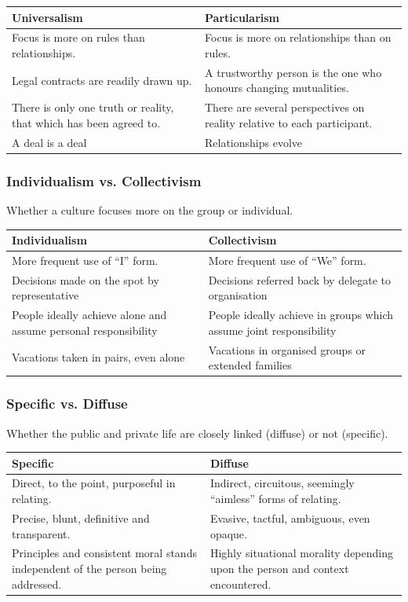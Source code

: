 \begin{tabularx}{\textwidth}{X|X}
	Universalism & Particularism \\ 
	\hline 
	Focus is more on rules than relationships. & Focus is more on relationships than on rules. \\ 
	Legal contracts are readily drawn up. & A trustworthy person is the one who honours changing mutualities. \\ 
	There is only one truth or reality, that which has been agreed to. & There are several perspectives on reality relative to each participant. \\ 
	A deal is a deal & Relationships evolve \\ 
\end{tabularx}

\subsubsection{Individualism vs. Collectivism}
Whether a culture focuses more on the group or individual.

\begin{tabularx}{\textwidth}{X|X}
	Individualism & Collectivism \\ 
	\hline 
	More frequent use of “I” form. & More frequent use of “We” form. \\ 
	Decisions made on the spot by representative & Decisions referred back by delegate to organisation \\ 
	People ideally achieve alone and assume personal responsibility & People ideally achieve in groups which assume joint responsibility \\ 
	Vacations taken in pairs, even alone & Vacations in organised groups or extended families \\ 
\end{tabularx}

\subsubsection{Specific vs. Diffuse}
Whether the public and private life are closely linked (diffuse) or not (specific).

\begin{tabularx}{\textwidth}{X|X}
	Specific & Diffuse \\ 
	\hline 
	Direct, to the point, purposeful in relating. & Indirect, circuitous, seemingly “aimless” forms of relating. \\
	Precise, blunt, definitive and transparent. & Evasive, tactful, ambiguous, even opaque. \\ 
	Principles and consistent moral stands independent of the person being addressed. & Highly situational morality depending upon
	the person and context encountered. \\ 
\end{tabularx}


